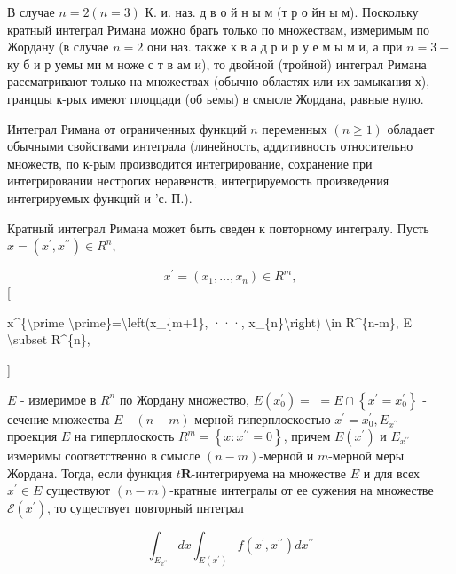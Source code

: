 \documentclass[10pt]{article}
\begin{document}
В случае $n=2(n=3)$ К. и. наз. д в о й н ы м (т р о йн ы м). Поскольку кратный интеграл Римана можно брать только по множествам, измеримым по Жордану (в случае $n=2$ они наз. также к в а д р и р у е м ы м и, а при $n=3-$ ку б и р уемы ми м ноже с т в ам и), то двойной (тройной) интеграл Римана рассматривают только на множествах (обычно областях или их замыкания х), гранццы к-рых имеют плоццади (об ьемы) в смысле Жордана, равные нулю.



Интеграл Римана от ограниченных функций $n$ переменных $(n \geqslant 1)$ обладает обычными свойствами интеграла (линейность, аддитивность относительно множеств, по к-рым производится интегрирование, сохранение при интегрировании нестрогих неравенств, интегрируемость произведения интегрируемых функций и 'с. П.).



Кратный интеграл Римана может быть сведен к повторному интегралу. Пусть $x=\left(x^{\prime}, x^{\prime \prime}\right) \in R^{n}$,



\[

x^{\prime}=\left(x_{1}, \ldots, x_{n}\right) \in R^{m},

\][



x\^{}\{\textbackslash prime \textbackslash prime\}=\textbackslash left(x\_\{m+1\}, ···, x\_\{n\}\textbackslash right) \textbackslash in R\^{}\{n-m\}, E \textbackslash subset R\^{}\{n\},

]



$E$ - измеримое в $R^{n}$ по Жордану множество, $E\left(x_{0}^{\prime}\right)=$ $=E \cap\left\{x^{\prime}=x_{0}^{\prime}\right\}$ - сечение множества $E \quad(n-m)$-мерной гиперплоскостью $x^{\prime}=x_{0}^{\prime}, E_{x^{\prime \prime}}-$ проекция $E$ на гиперплоскость $R^{m}=\left\{x: x^{\prime \prime}=0\right\}$, причем $E\left(x^{\prime}\right)$ и $E_{x^{\prime \prime}}$ измеримы соответственно в смысле $(n-m)$-мерной и $m$-мерной меры Жордана. Тогда, если функция $t \boldsymbol{R}$-интегрируема на множестве $E$ и для всех $x^{\prime} \in E$ существуют $(n-m)$-кратные интегралы от ее сужения на множестве $\mathscr{E}\left(x^{\prime}\right)$, то существует повторный пнтеграл



\[

\int_{E_{x^{\prime \prime}}} d x \int_{E\left(x^{\prime}\right)} f\left(x^{\prime}, x^{\prime \prime}\right) d x^{\prime \prime}

\]
\end{document}
